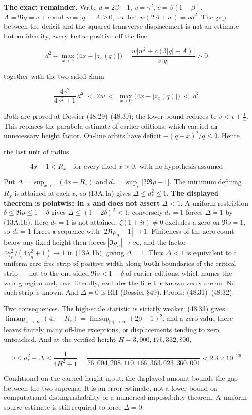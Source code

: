 \documentclass[
  11pt,
]{book}
\begin{document}
\textbf{The exact remainder.} Write \(d=2\beta-1\), \(v=\gamma^2\),
\(c=\beta(1-\beta)\), \(A=\Re q=v+c\) and \(w=|q|-A\ge0\), so that
\(w(2A+w)=vd^2\). The gap between the deficit and the squared transverse
displacement is not an estimate but an identity, every factor positive
off the line:

\[
\boxed{\ d^2-\max_{x>0}\bigl(4x-|z_x(q)|\bigr)
=\frac{w\bigl[w^2+c(3|q|-A)\bigr]}{v\,|q|}>0\ }
\tag{13A.1a}
\]

together with the two-sided chain

\[
\frac{4\gamma^2}{4\gamma^2+1}\,d^2\;<\;2w\;<\;\max_{x>0}\bigl(4x-|z_x(q)|\bigr)\;<\;d^2
\tag{13A.1b}
\]

Both are proved at Dossier (48.29)--(48.30); the lower bound reduces to
\(v<v+\tfrac14\). This replaces the parabola estimate of earlier
editions, which carried an unnecessary height factor. On-line orbits
have deficit \(-(q-x)^2/q\le0\). Hence

\begin{tnclosed}{the last unit of radius}

\[
\boxed{\;4x-1<R_x\quad\text{for every fixed }x>0,\ \text{with no hypothesis assumed}\;}
\tag{13A.2}
\]

Put \(\Delta=\sup_{x>0}(4x-R_x)\) and \(d_\ast=\sup_\rho|2\Re\rho-1|\).
The minimum defining \(R_x\) is attained at each \(x\), so (13A.1a)
gives \(\Delta\le d_\ast^2\le1\). \textbf{The displayed theorem is
pointwise in \(x\) and does not assert \(\Delta<1\).} A uniform
restriction \(\delta\le\Re\rho\le1-\delta\) gives
\(\Delta\le(1-2\delta)^2<1\); conversely \(d_\ast=1\) forces
\(\Delta=1\) by (13A.1b). Here \(d_\ast=1\) is not attained:
\(\zeta(1+it)\ne0\) excludes a zero on \(\Re s=1\), so \(d_\ast=1\)
forces a sequence with \(|2\Re\rho_n-1|\to1\). Finiteness of the zero
count below any fixed height then forces \(|\Im\rho_n|\to\infty\), and
the factor \(4\gamma_n^2/(4\gamma_n^2+1)\to1\) in (13A.1b), giving
\(\Delta=1\). Thus \(\Delta<1\) is equivalent to a uniform zero-free
strip of positive width along \textbf{both} boundaries of the critical
strip --- not to the one-sided \(\Re s<1-\delta\) of earlier editions,
which names the wrong region and, read literally, excludes the line the
known zeros are on. No such strip is known. And \(\Delta=0\) is RH
(Dossier §49). Proofs: (48.31)--(48.32).

Two consequences. The high-scale statistic is strictly weaker: (48.33)
gives
\(\limsup_{x\to\infty}(4x-R_x)=\limsup_{|\gamma|\to\infty}(2\beta-1)^2\),
and a zero value there leaves finitely many off-line exceptions, or
displacements tending to zero, untouched. And at the verified height
\(H=3{,}000{,}175{,}332{,}800\),

\[
0\le d_\ast^2-\Delta\le\frac1{4H^2+1}
=\frac1{36{,}004{,}208{,}110{,}166{,}363{,}023{,}360{,}001}
<2.8\times10^{-26}
\tag{13A.2a}
\]

Conditional on the carried height input, the displayed amount bounds the
gap between the two suprema. It is an error estimate, not a lower bound
on computational distinguishability or a numerical-impossibility
theorem. A uniform source estimate is still required to force
\(\Delta=0\).

\end{tnclosed}
\end{document}
